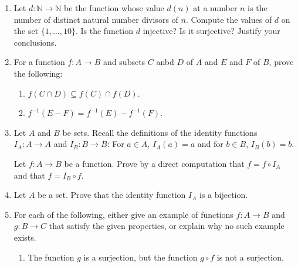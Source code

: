 \documentclass[12pt]{article}
\newcommand{\NN}{{\mathbb N}}  %
\begin{document}
\begin{enumerate}
\item  Let $d\colon\NN\to\NN$ be the function whose value $d(n)$ at a number $n$ is the number of distinct natural number divisors of
  $n$. 
  Compute the values of $d$ on the set $\{1,\dotsc,10\}$.
  Is the function $d$ injective?  Is it surjective?  Justify your conclusions.

  
\item For a function $f\colon A\to B$ and subsets $C$ anbd $D$ of $A$ and $E$ and $F$ of $B$, prove the following:

 \begin{enumerate}
  \item  $f(C\cap D)\subseteq f(C)\cap f(D)$.

  \item  $f^{-1}(E-F)= f^{-1}(E) - f^{-1}(F)$.

 \end{enumerate}  

  
  \item  Let $A$ and $B$ be sets.
    Recall the definitions of the identity functions $I_A\colon A\to A$ and  $I_B\colon B\to B$:
    For $a\in A$, $I_A(a)=a$ and for $b\in B$, $I_B(b)=b$.

    Let $f\colon A\to B$ be a function.
    Prove by a direct computation that $f=f\circ I_A$ and that $f=I_B\circ f$.

  \item  Let $A$ be a set.  Prove that the identity function $I_A$ is a bijection.

\item For each of the following, either give an example of functions $f\colon A\to B$ and $g\colon B\to C$ that satisfy the given
  properties, or explain why no such example exists.

 \begin{enumerate}
  \item The function $g$ is a surjection, but the function $g\circ f$ is not a surjection.


\end{enumerate}
\end{enumerate}
\end{document}
